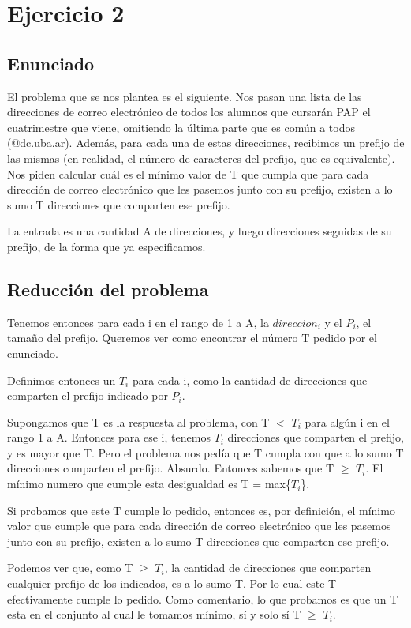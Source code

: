 \section{Ejercicio 2}

\subsection{Enunciado}

El problema que se nos plantea es el siguiente. Nos pasan una lista de las direcciones de correo electrónico de todos los alumnos que cursarán PAP el cuatrimestre que viene, omitiendo la última parte que es común a todos (@dc.uba.ar). Además, para cada una de estas direcciones, recibimos un prefijo de las mismas (en realidad, el número de caracteres del prefijo, que es equivalente).
Nos piden calcular cuál es el mínimo valor de T que cumpla que para cada dirección
de correo electrónico que les pasemos junto con su prefijo, existen a lo sumo T direcciones que comparten ese prefijo.

La entrada es una cantidad A de direcciones, y luego direcciones seguidas de su prefijo, de la forma que ya especificamos.

\subsection{Reducción del problema}

Tenemos entonces para cada i en el rango de 1 a A, la $direccion_i$ y el $P_i$, el tamaño del prefijo.
Queremos ver como encontrar el número T pedido por el enunciado.
\par{Definimos entonces un $T_i$ para cada i, como la cantidad de direcciones que comparten el prefijo indicado por $P_i$. }
\par{Supongamos que T es la respuesta al problema, con T $<$ $T_i$ para algún i en el rango 1 a A. Entonces para ese i, tenemos $T_i$ direcciones que comparten el prefijo, y es mayor que T. Pero el problema nos pedía que T cumpla con que a lo sumo T direcciones comparten el prefijo. Absurdo.
Entonces sabemos que T $\geq$ $T_i$. El mínimo numero que cumple esta desigualdad es T = max\{$T_i$\}.} \par{Si probamos que este T cumple lo pedido, 
entonces es, por definición, el mínimo valor que cumple que para cada dirección
de correo electrónico que les pasemos junto con su prefijo, existen a lo sumo T direcciones que comparten ese prefijo.}
\par{Podemos ver que, como T $\geq$ $T_i$, la cantidad de direcciones que comparten cualquier prefijo de los indicados, es a lo sumo T.
Por lo cual este T efectivamente cumple lo pedido. 
Como comentario, lo que probamos es que un T esta en el conjunto al cual le tomamos mínimo, sí y solo sí T $\geq$ $T_i$.}

